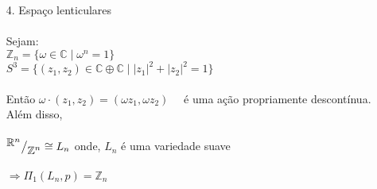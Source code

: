\begin{ex}
\begin{itemize}
        \item[4.] Espaço lenticulares\\\\
        Sejam:\\
        $\mathbb{Z}_n = \{\omega \in \mathbb{C}\mid \omega^n =1\}$\\
        $S^3 =\{(z_1,z_2)\in \mathbb{C}\oplus\mathbb{C}\mid |z_1|^2 + |z_2|^2 = 1\}$\\\\
        Então $\omega\cdot(z_1,z_2) = (\omega z_1,\omega z_2)$ \ \ é uma ação propriamente descontínua. Além disso,\\\\
        $\mkern-18mu \quad{^{\textstyle \mathbb{R}^n}\big/_{\textstyle \mathbb{Z}^n}} \cong L_n$ onde, $L_n$ é uma variedade suave\\\\
        
        $\Rightarrow \Pi_1(L_n , p) = \mathbb{Z}_n$\\     
        
    \end{itemize} 
\end{ex}
 

